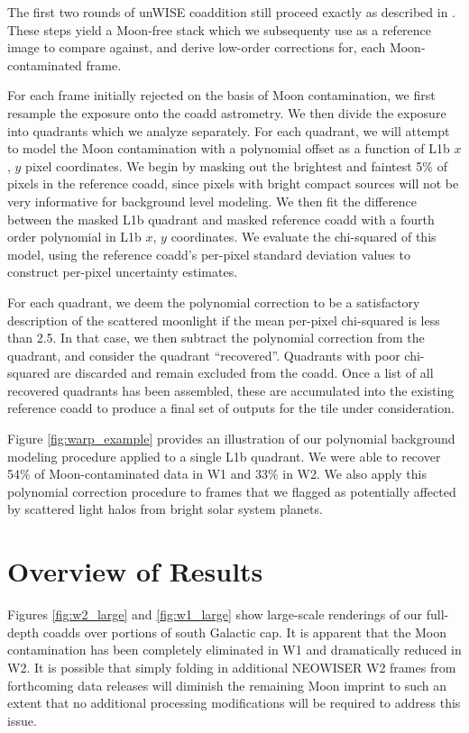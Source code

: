 \documentclass{emulateapj}
\begin{document}
The first two rounds of unWISE coaddition still proceed exactly as 
described in \cite{lang14}. These steps yield a Moon-free stack which we 
subsequenty use as a reference image to compare against, and derive low-order 
corrections for, each Moon-contaminated frame.

For each frame initially rejected on the basis of Moon contamination, we 
first resample the exposure onto the coadd astrometry. We then divide
the exposure into quadrants which we analyze separately. For each quadrant,
we will attempt to model the Moon contamination with a polynomial 
offset as a function of L1b $x$, $y$ pixel coordinates. We begin by masking out 
the brightest and faintest 5\% of pixels in the reference coadd, since pixels
with bright compact sources will not be very informative for background level
modeling. We then fit the difference between the masked L1b quadrant and masked
reference coadd with a fourth order polynomial in L1b $x$, $y$ coordinates. We 
evaluate the chi-squared of this model, using the reference coadd's per-pixel
standard deviation values to construct per-pixel uncertainty estimates.

For each quadrant, we deem the polynomial correction to be a satisfactory 
description of the scattered moonlight if the mean per-pixel chi-squared is 
less than 2.5. In that case, we then subtract the polynomial correction from 
the quadrant, and consider the quadrant ``recovered''. Quadrants with poor 
chi-squared are discarded and remain excluded from the coadd. Once a list of 
all recovered quadrants has been assembled, these are accumulated into the 
existing reference coadd to produce a final set of outputs for the tile under 
consideration.

Figure \ref{fig:warp_example} provides an illustration of our polynomial 
background modeling procedure applied to a single L1b quadrant. We were able to 
recover 54\% of Moon-contaminated data in W1 and 33\% in W2. We also apply this
polynomial correction procedure to frames that we flagged as potentially 
affected by scattered light halos from bright solar system planets.

\section{Overview of Results}
\label{sec:results}

Figures \ref{fig:w2_large} and \ref{fig:w1_large} show large-scale renderings 
of our full-depth coadds over portions of south Galactic cap. It is apparent 
that the Moon contamination has been completely eliminated in
W1 and dramatically reduced in W2. It is possible that simply folding in 
additional NEOWISER W2 frames from forthcoming data releases will diminish the 
remaining Moon imprint to such an extent that no additional processing 
modifications will be required to address this issue.
\end{document}
